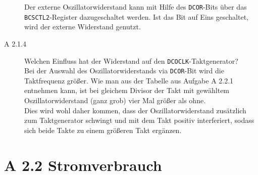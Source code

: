 \documentclass[11pt,a4paper,ngerman]{article}
\begin{document}
\begin{description}
		Der externe Oszillatorwiderstand kann mit Hilfe des \texttt{DCOR}-Bits über das \texttt{BCSCTL2}-Register dazugeschaltet werden. Ist das Bit auf Eins geschaltet, wird der externe Widerstand genutzt.	
		
	\item[A 2.1.4] Welchen Einfluss hat der Widerstand auf den \texttt{DCOCLK}-Taktgenerator?  \\
	
	Bei der Auswahl des Oszillatorwiderstands via \texttt{DCOR}-Bit wird die Taktfrequenz größer. Wie man aus der Tabelle aus Aufgabe A 2.2.1 entnehmen kann, ist bei gleichem Divisor der Takt mit gewähltem Oszillatorwiderstand (ganz grob) vier Mal größer als ohne. \\
Dies wird wohl daher kommen, dass der Oszillatorwiderstand zusätzlich zum Taktgenerator schwingt und mit dem Takt positiv interferiert, sodass sich beide Takte zu einem größeren Takt ergänzen.

\end{description}

\newpage
\section*{A 2.2 Stromverbrauch}
\end{document}
